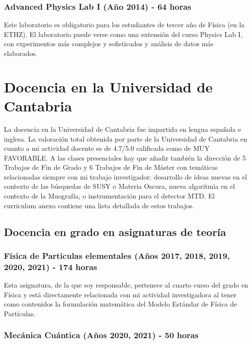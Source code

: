 \subsubsection{Advanced Physics Lab I (Año 2014) - 64 horas}

Este laboratorio es obligatorio para los estudiantes de tercer año de Física (en la ETHZ). El laboratorio puede verse como una extensión del curso Physics Lab I, con experimentos más complejos y sofisticados y análisis de datos más elaborados.


\section{Docencia en la Universidad de Cantabria}

La docencia en la Universidad de Cantabria fue impartida en lengua española e inglesa. La valoración total obtenida por parte de la Universidad de Cantabria en cuanto a mi actividad docente es de 4.7/5.0 calificada como de MUY FAVORABLE. A las clases presenciales hay que añadir también la dirección de 5 Trabajos de Fin de Grado y 6 Trabajos de Fin de Máster con temáticas relacionadas siempre con mi trabajo investigador: desarrollo de ideas nuevas en el contexto de las búsquedas de SUSY o Materia Oscura, nueva algoritmia en el contexto de la Muografía, o instrumentación para el detector MTD. El curriculum anexo contiene una lista detallada de estos trabajos.

\subsection{Docencia en grado en asignaturas de teoría}

\subsubsection{Física de Partículas elementales (Años 2017, 2018, 2019, 2020, 2021) - 174 horas }

Esta asignatura, de la que soy responsable, pertenece al cuarto curso del grado en Física y está directamente relacionada con mi actividad investigadora al tener como contenidos la formulación matemática del Modelo Estándar de Física de Partículas.

\subsubsection{Mecánica Cuántica (Años 2020, 2021) - 50 horas}


